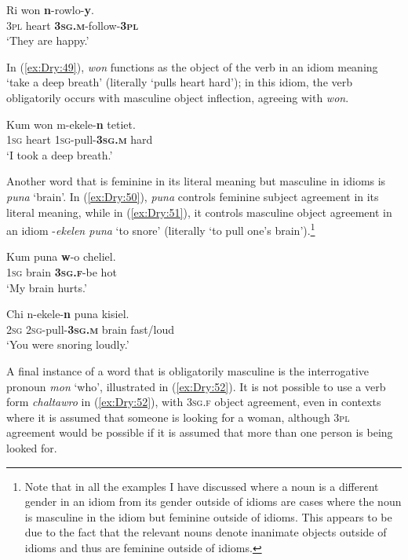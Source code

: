 \documentclass[output=collectionpaper]{langsci/langscibook}
\begin{document}
\ea    \label{ex:Dry:48}
\gll Ri	won	\textbf{n}-rowlo-\textbf{y}.\\
\textsc{3pl} heart \textbf{\textsc{3sg.m}}-follow-\textbf{\textsc{3pl}}\\
\glt `They are happy.'
\z

In (\ref{ex:Dry:49}), \textit{won} functions as the object of the verb in an idiom meaning `take a deep breath' (literally `pulls heart hard'); in this idiom, the verb obligatorily occurs with masculine object inflection, agreeing with \textit{won}.

\ea \label{ex:Dry:49}
\gll Kum	won	m-ekele-\textbf{n}	tetiet.\\
\textsc{1sg} heart \textsc{1sg}-pull-\textbf{\textsc{3sg.m}} hard\\
\glt `I took a deep breath.'
\z

Another word that is feminine in its literal meaning but masculine in idioms is \textit{puna} `brain'. In (\ref{ex:Dry:50}), \textit{puna} controls feminine subject agreement in its literal meaning, while in (\ref{ex:Dry:51}), it controls masculine object agreement in an idiom -\textit{ekelen puna} `to snore' (literally `to pull one's brain').\footnote{Note that in all the examples I have discussed where a noun is a different gender in an idiom from its gender outside of idioms are cases where the noun is masculine in the idiom but feminine outside of idioms. This appears to be due to the fact that the relevant nouns denote inanimate objects outside of idioms and thus are feminine outside of idioms.}

\ea \label{ex:Dry:50}
\gll Kum	puna	\textbf{w}-o	cheliel.\\
\textsc{1sg} brain \textbf{\textsc{3sg.f}}-be hot\\
\glt `My brain hurts.'
\z

\ea \label{ex:Dry:51}
\gll Chi	n-ekele-\textbf{n}	puna	kisiel.\\
\textsc{2sg} \textsc{2sg}-pull-\textbf{\textsc{3sg.m}} brain fast/loud\\
\glt `You were snoring loudly.'
\z

A final instance of a word that is obligatorily masculine is the interrogative pronoun \textit{mon} `who', illustrated in (\ref{ex:Dry:52}). It is not possible to use a verb form \textit{chaltawro} in (\ref{ex:Dry:52}), with \textsc{3sg.f} object agreement, even in contexts where it is assumed that someone is looking for a woman, although \textsc{3pl} agreement would be possible if it is assumed that more than one person is being looked for.
\end{document}
